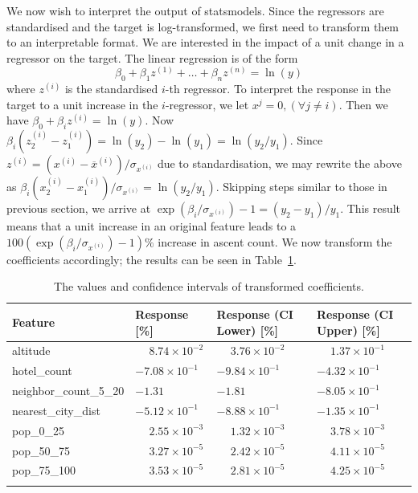 \documentclass[11pt,a4paper]{article}
\begin{document}
We now wish to interpret the output of statsmodels. Since the regressors are standardised and the target is log-transformed, we first need to transform them to an interpretable format. We are interested in the impact of a unit change in a regressor on the target. The linear regression is of the form 
$$\beta_0+\beta_1z^{(1)}+ \dots + \beta_n z^{(n)}=\ln(y)$$ 
where $z^{(i)}$ is the standardised $i$-th regressor. To interpret the response in the target to a unit increase in the $i$-regressor, we let $x^j = 0, (\forall j \neq i)$. Then we have $\beta_0 + \beta_i z^{(i)} = \ln(y)$. Now $\beta_i (z_2^{(i)} - z_1^{(i)}) = \ln(y_2) - \ln(y_1)=\ln(y_2/y_1)$. Since 
$z^{(i)} = (x^{(i)} - \overline{x}^{(i)})/\sigma_{x^{(i)}}$
due to standardisation, we may rewrite the above as $\beta_i (x_2^{(i)} - x_1^{(i)})/\sigma_{x^{(i)}} =\ln(y_2/y_1)$. Skipping steps similar to those in previous section, we arrive at $\exp(\beta_i / \sigma_{x^{(i)}}) - 1 = (y_2 - y_1) / y_1$. This result means that a unit increase in an original feature leads to a $100\left(\exp(\beta_i / \sigma_{x^{(i)}}) - 1\right)\%$ increase in ascent count. We now transform the coefficients accordingly; the results can be seen in Table~\ref{table:2}.
\begin{table} [h!]
\centering
\caption{The values and confidence intervals of transformed coefficients.}
\begin{tabular}{l l l l}
\toprule
    Feature & 
    Response [\%] & 
    Response (CI Lower) [\%] & 
    Response (CI Upper) [\%] \\
\midrule
altitude & $\phantom{-}8.74 \times 10^{-2}$ & $\phantom{-}3.76\times 10^{-2}$ & $\phantom{-}1.37\times 10^{-1}$ \\
hotel\_count & $-7.08\times 10^{-1}$ & $-9.84\times 10^{-1}$ & $-4.32\times 10^{-1}$ \\
neighbor\_count\_5\_20 & $-1.31$ & $-1.81$ & $-8.05\times 10^{-1}$ \\
nearest\_city\_dist & $-5.12\times 10^{-1}$ & $-8.88\times 10^{-1}$ & $-1.35\times 10^{-1}$ \\
pop\_0\_25 & $\phantom{-}2.55 \times 10^{-3}$ & $\phantom{-}1.32\times 10^{-3}$ & $\phantom{-}3.78\times 10^{-3}$ \\
pop\_50\_75 & $\phantom{-}3.27 \times 10^{-5}$ & $\phantom{-}2.42\times 10^{-5}$ &  $\phantom{-}4.11\times 10^{-5}$ \\
pop\_75\_100 & $\phantom{-}3.53 \times 10^{-5}$ & $\phantom{-}2.81\times 10^{-5}$ &  $\phantom{-}4.25\times 10^{-5}$\\
\bottomrule
\label{table:2}
\end{tabular}
\end{table}
\end{document}
